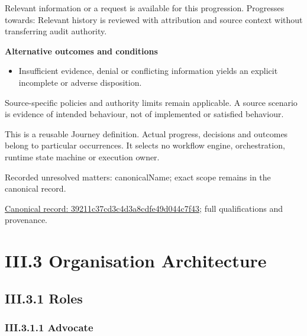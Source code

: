 Relevant information or a request is available for this progression. Progresses towards: Relevant history is reviewed with attribution and source context without transferring audit authority.



\par\medskip\textbf{Alternative outcomes and conditions}\par


\begin{itemize}


\item Insufficient evidence, denial or conflicting information yields an explicit incomplete or adverse disposition.

\end{itemize}


Source-specific policies and authority limits remain applicable. A source scenario is evidence of intended behaviour, not of implemented or satisfied behaviour.



This is a reusable Journey definition. Actual progress, decisions and outcomes belong to particular occurrences. It selects no workflow engine, orchestration, runtime state machine or execution owner.


{\small Recorded unresolved matters: canonicalName; exact scope remains in the canonical record.}\par
{\footnotesize \href{../../../../continuum/strategy/value-stream/39211c37cd3c4d3a8cdfe49d044c7f43.md}{Canonical record: 39211c37cd3c4d3a8cdfe49d044c7f43}; full qualifications and provenance.}\par
\chapter*{III.3 Organisation Architecture}
\label{navigation:III.3}

\section*{III.3.1 Roles}
\label{navigation:III.3.1}

\subsection*{III.3.1.1 Advocate}
\label{navigation:III.3.1.1}

